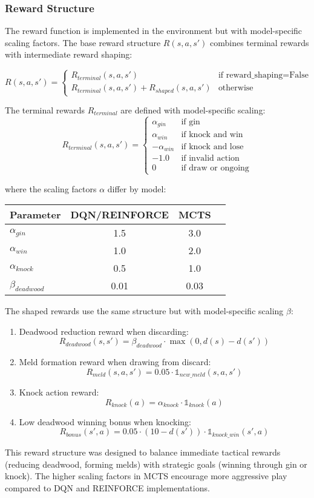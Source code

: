 
\subsubsection{Reward Structure}

The reward function is implemented in the environment but with model-specific scaling factors. The base reward structure $R(s,a,s')$ combines terminal rewards with intermediate reward shaping:

\[
R(s,a,s') = \begin{cases}
R_{terminal}(s,a,s') & \text{if } \text{reward\_shaping} = \text{False} \\
R_{terminal}(s,a,s') + R_{shaped}(s,a,s') & \text{otherwise}
\end{cases}
\]

The terminal rewards $R_{terminal}$ are defined with model-specific scaling:
\[
R_{terminal}(s,a,s') = \begin{cases}
\alpha_{gin} & \text{if gin} \\
\alpha_{win} & \text{if knock and win} \\
-\alpha_{win} & \text{if knock and lose} \\
-1.0 & \text{if invalid action} \\
0 & \text{if draw or ongoing}
\end{cases}
\]

where the scaling factors $\alpha$ differ by model:
\begin{table}[h]
\centering
\begin{tabular}{lccc}
\hline
Parameter & DQN/REINFORCE & MCTS \\
\hline
$\alpha_{gin}$ & 1.5 & 3.0 \\
$\alpha_{win}$ & 1.0 & 2.0 \\
$\alpha_{knock}$ & 0.5 & 1.0 \\
$\beta_{deadwood}$ & 0.01 & 0.03 \\
\hline
\end{tabular}
\end{table}

The shaped rewards use the same structure but with model-specific scaling $\beta$:

\begin{enumerate}
\item Deadwood reduction reward when discarding:
\[
R_{deadwood}(s,s') = \beta_{deadwood} \cdot \max(0, d(s) - d(s'))
\]

\item Meld formation reward when drawing from discard:
\[
R_{meld}(s,a,s') = 0.05 \cdot \mathbb{1}_{new\_meld}(s,a,s')
\]

\item Knock action reward:
\[
R_{knock}(a) = \alpha_{knock} \cdot \mathbb{1}_{knock}(a)
\]

\item Low deadwood winning bonus when knocking:
\[
R_{bonus}(s',a) = 0.05 \cdot (10 - d(s')) \cdot \mathbb{1}_{knock\_win}(s',a)
\]
\end{enumerate}

This reward structure was designed to balance immediate tactical rewards (reducing deadwood, forming melds) with strategic goals (winning through gin or knock). The higher scaling factors in MCTS encourage more aggressive play compared to DQN and REINFORCE implementations. 